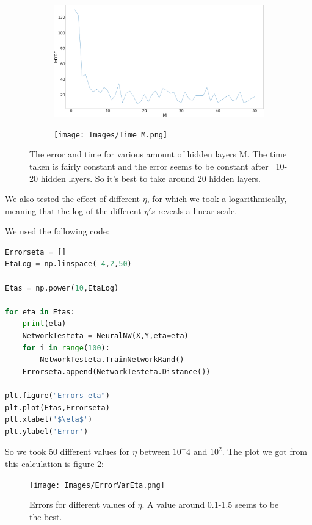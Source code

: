 \documentclass[a4paper]{article}
\begin{document}
\begin{figure}[H]	
	\begin{subfigure}{0.45\textwidth} %
		\includegraphics[width=\textwidth]{Images/Errors_M.png}
	\end{subfigure}
	\begin{subfigure}{0.45\textwidth} %
		\texttt{[image: Images/Time\_M.png]}
	\end{subfigure}
	\caption{The error and time for various amount of hidden layers M. The time taken is fairly constant and the error seems to be constant after ~10-20 hidden layers. So it's best to take around 20 hidden layers.}
	\label{Merror}
\end{figure}


We also tested the effect of different $\eta$, for which we took a logarithmically, meaning that the log of the different $\eta's$ reveals a linear scale.

We used the following code:

\begin{lstlisting}[language=Python]
Errorseta = []
EtaLog = np.linspace(-4,2,50)

Etas = np.power(10,EtaLog)

for eta in Etas:
    print(eta)
    NetworkTesteta = NeuralNW(X,Y,eta=eta)
    for i in range(100):
        NetworkTesteta.TrainNetworkRand()
    Errorseta.append(NetworkTesteta.Distance())

plt.figure("Errors eta")
plt.plot(Etas,Errorseta)
plt.xlabel('$\eta$')
plt.ylabel('Error')
\end{lstlisting}

So we took 50 different values for $\eta$ between $10^-4$ and $10^2$. The plot we got from this calculation is figure \ref{EtaErr}:

\begin{figure}[H]
\texttt{[image: Images/ErrorVarEta.png]}
\caption{Errors for different values of $\eta$. A value around 0.1-1.5 seems to be the best.}
\label{EtaErr}
\end{figure}
\end{document}
